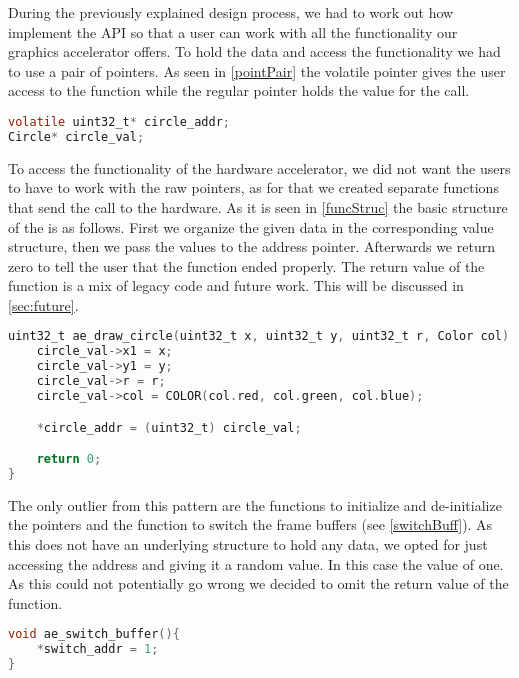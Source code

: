 During the previously explained design process, we had to work out how implement the API so that a user can work with all the functionality our graphics accelerator offers. To hold the data and access the functionality we had to use a pair of pointers. As seen in \cref{pointPair} the volatile pointer gives the user access to the function while the regular pointer holds the value for the call.
\begin{lstlisting}[language=C, caption={Pair of pointers}, label=pointPair]
volatile uint32_t* circle_addr;
Circle* circle_val;
\end{lstlisting}
To access the functionality of the hardware accelerator, we did not want the users to have to work with the raw pointers, as for that we created separate functions that send the call to the hardware. As it is seen in \cref{funcStruc} the basic structure of the is as follows. First we organize the given data in the corresponding value structure, then we pass the values to the address pointer. Afterwards we return zero to tell the user that the function ended properly. The return value of the function is a mix of legacy code and future work. This will be discussed in \cref{sec:future}.
\begin{lstlisting}[language=C, caption={Structure of the functions}, label=funcStruc]
uint32_t ae_draw_circle(uint32_t x, uint32_t y, uint32_t r, Color col) {
	circle_val->x1 = x;
	circle_val->y1 = y;
	circle_val->r = r;
	circle_val->col = COLOR(col.red, col.green, col.blue); 

	*circle_addr = (uint32_t) circle_val;

	return 0;
}
\end{lstlisting}
The only outlier from this pattern are the functions to initialize and de-initialize the pointers and the function to switch the frame buffers (see \cref{switchBuff}). As this does not have an underlying structure to hold any data, we opted for just accessing the address and giving it a random value. In this case the value of one. As this could not potentially go wrong we decided to omit the return value of the function.
\begin{lstlisting}[language=C, caption={Switching the Buffer}, label=switchBuff]
void ae_switch_buffer(){
	*switch_addr = 1;
}
\end{lstlisting}